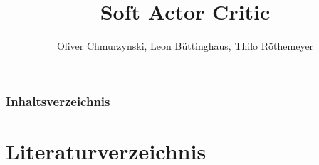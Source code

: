 \documentclass[11pt]{beamer}
\author{Oliver Chmurzynski, Leon Büttinghaus, Thilo Röthemeyer}
\title{Soft Actor Critic}
\begin{document}
\begin{frame}
\titlepage
\end{frame}


\begin{frame}
    \frametitle{Inhaltsverzeichnis}
    \tableofcontents
\end{frame}





\section{Literaturverzeichnis}
\begin{frame}
{\scriptsize
\nocite{SAC18}
\nocite{autoencoding}
\nocite{grokking}
\nocite{FuncApp}

}
\end{frame}
\end{document}
